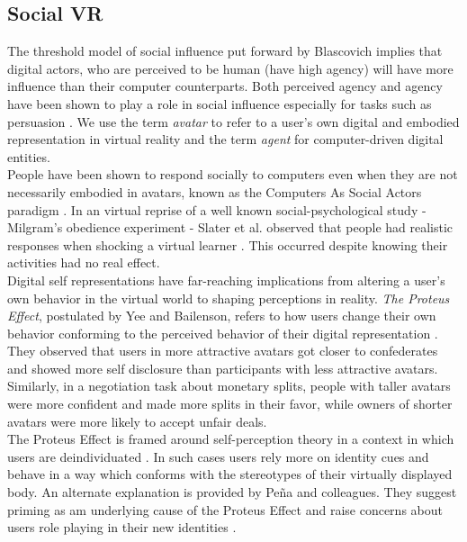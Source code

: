 \subsection{Social VR}

The threshold model of social influence put forward by Blascovich \cite{blascovich2002theoretical} implies that digital actors, who are perceived to be human (have high agency) will have more influence than their computer counterparts. Both perceived agency and agency have been shown to play a role in social influence especially for tasks such as persuasion \cite{guadagno2007virtual,fox2015avatars}. 
We use the term \textit{avatar} to refer to a user’s own digital and embodied representation in virtual reality and the term \textit{agent} for computer-driven digital entities. \\
People have been shown to respond socially to computers even when they are not necessarily embodied in avatars, known as the Computers As Social Actors paradigm \cite{nass1994computers}. 
In an virtual reprise of a well known social-psychological study - Milgram’s obedience experiment - Slater et al. observed that people had realistic responses when shocking a virtual learner \cite{slater2006virtual}.
This occurred despite knowing their activities had no real effect.\\
Digital self representations have far-reaching implications from altering a user’s own behavior in the virtual world to shaping perceptions in reality.
\textit{The Proteus Effect}, postulated by Yee and Bailenson, refers to how users change their own behavior conforming to the perceived behavior of their digital representation \cite{yee2007proteus}. 
 They observed that users in more attractive avatars got closer to confederates and showed more self disclosure than participants with less attractive avatars. Similarly, in a negotiation task about monetary splits, people with taller avatars were more confident and made more splits in their favor, while owners of shorter avatars were more likely to accept unfair deals. \\
The Proteus Effect is framed around self-perception theory \cite{bem1972self} in a context in which users are deindividuated \cite{zimbardo1969human}. In such cases users rely more on identity cues and behave in a way which conforms with the stereotypes of their virtually displayed body. An alternate explanation is provided by Peña and colleagues. They suggest priming as am underlying cause of the Proteus Effect and raise concerns about users role playing in their new identities \cite{pena2009priming}.
